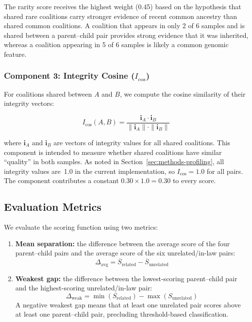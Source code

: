 \documentclass{../yalumba}
\begin{document}
The rarity score receives the highest weight (0.45) based on the hypothesis
that shared rare coalitions carry stronger evidence of recent common ancestry
than shared common coalitions.  A coalition that appears in only 2 of 6
samples and is shared between a parent--child pair provides strong evidence
that it was inherited, whereas a coalition appearing in 5 of 6 samples is
likely a common genomic feature.

\subsubsection{Component 3: Integrity Cosine ($I_{\cos}$)}

For coalitions shared between $A$ and $B$, we compute the cosine similarity
of their integrity vectors:

\begin{equation}
  I_{\cos}(A, B) = \frac{\mathbf{i}_A \cdot \mathbf{i}_B}{\|\mathbf{i}_A\| \cdot \|\mathbf{i}_B\|}
  \label{eq:integrity-cosine}
\end{equation}

\noindent where $\mathbf{i}_A$ and $\mathbf{i}_B$ are vectors of integrity
values for all shared coalitions.  This component is intended to measure
whether shared coalitions have similar ``quality'' in both samples.  As noted
in Section~\ref{sec:methods-profiling}, all integrity values are~1.0 in the
current implementation, so $I_{\cos} = 1.0$ for all pairs.  The component
contributes a constant $0.30 \times 1.0 = 0.30$ to every score.

\subsection{Evaluation Metrics}
\label{sec:methods-eval}

We evaluate the scoring function using two metrics:

\begin{enumerate}
  \item \textbf{Mean separation:} the difference between the average score
        of the four parent--child pairs and the average score of the six
        unrelated/in-law pairs:
        \begin{equation}
          \Delta_{\mathrm{avg}} = \overline{S}_{\mathrm{related}} - \overline{S}_{\mathrm{unrelated}}
          \label{eq:separation}
        \end{equation}
  \item \textbf{Weakest gap:} the difference between the lowest-scoring
        parent--child pair and the highest-scoring unrelated/in-law pair:
        \begin{equation}
          \Delta_{\mathrm{weak}} = \min(S_{\mathrm{related}}) - \max(S_{\mathrm{unrelated}})
          \label{eq:weakest-gap}
        \end{equation}
        A negative weakest gap means that at least one unrelated pair scores
        above at least one parent--child pair, precluding threshold-based
        classification.
\end{enumerate}
\end{document}
